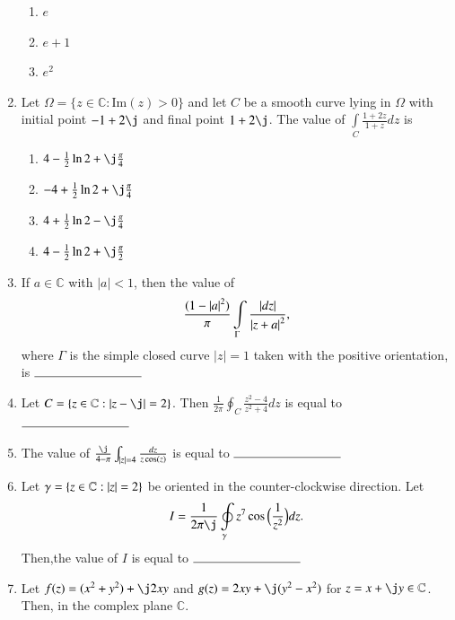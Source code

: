 \documentclass[journal,12pt,twocolumn]{IEEEtran}
\begin{document}
\begin{enumerate}[1.]
\begin{enumerate}
\item $
e
$

\item $
e+1
$

\item $
e^2
$

\end{enumerate}


\item Let $\Omega = \lbrace z \in \mathbb{C} : \text{Im}(z) > 0 \rbrace $ and let $C$ be a smooth curve lying in $\Omega $ with initial point $ -1 + 2\j$ and final point $1+2\j$. The value of $ \int\limits_{C} \frac{1+2z}{1+z} dz $ is

\begin{enumerate}

\item $
4-\frac{1}{2} \ln 2+ \j \frac{\pi}{4}
$

\item $
-4+\frac{1}{2} \ln 2+ \j \frac{\pi}{4}
$

\item $
4+\frac{1}{2} \ln 2- \j \frac{\pi}{4}
$

\item $
4-\frac{1}{2} \ln 2+ \j \frac{\pi}{2}
$

\end{enumerate}

\item If $a \in \mathbb{C} $ with $ \mid a \mid < 1 $, then the value of
$$\frac{(1- { \left\vert a\right\vert  }^2)}{\pi} \int\limits_{\Gamma} \frac{ \left\vert dz\right\vert}{{\left\vert z+a\right\vert  }^2}, $$
where $\Gamma$ is the simple closed curve $ \mid z \mid =1 $  taken with the positive orientation, is 
$\rule{3cm}{0.15mm}$


\item Let $C = \lbrace z \in \mathbb{C} :  \abs{z-\j} =2 \rbrace $. Then $ \frac{1}{2 \pi} \oint_{C} \frac{z^2-4}{z^2+4} dz $ is equal to $ \rule{3cm}{0.15mm}$

\item The value of $\frac{\j}{4 - \pi} \int_{\mid z \mid =4} \frac{dz}{z \cos(z)}$ is equal to $\rule{3cm}{0.15mm}$

\item Let $ \gamma =\lbrace z \in \mathbb{C} :  \left\vert z\right\vert=2 \rbrace $ be oriented in the counter-clockwise direction. Let
$$ I = \frac{1}{2 \pi \j} \oint\limits_{\gamma} z^7 \cos \Big(\frac{1}{z^2}\Big) dz. $$
Then,the value of $I$ is equal to $\rule{3cm}{0.15mm}$ 

\item Let $f(z)=(x^2+y^2)+\j 2 xy $ and $g(z)= 2 xy + \j (y^2-x^2) $ for $z= x+ \j y \in \mathbb{C} $. Then, in the complex plane $\mathbb{C}$.


\end{enumerate}
\end{document}
